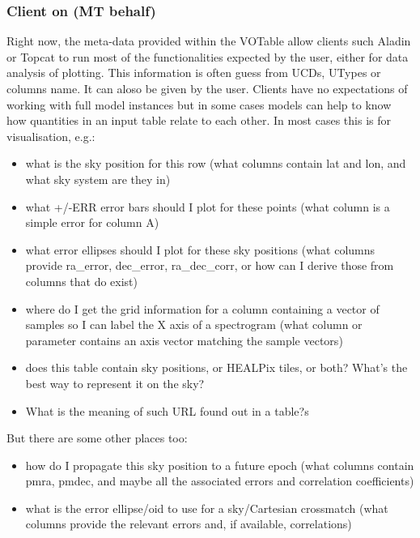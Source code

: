 \documentclass[11pt,a4paper]{ivoa}
\begin{document}
\subsubsection{Client on (MT behalf)}

Right now, the meta-data provided within the VOTable allow clients such Aladin or Topcat to run most of the functionalities expected by the user, either for data analysis of plotting.
This information is often guess from UCDs, UTypes or columns name. It can aloso be given by the user.
Clients have no expectations of working with full model instances but in some cases models can help to know how quantities in an input table relate to each other.
In most cases this is for visualisation, e.g.:
\begin{itemize}
    \item what is the sky position for this row
    (what columns contain lat and lon, and what sky system are they in)

     \item what +/-ERR error bars should I plot for these points
    (what column is a simple error for column A)

    \item what error ellipses should I plot for these sky positions
    (what columns provide ra\_error, dec\_error, ra\_dec\_corr,
     or how can I derive those from columns that do exist)

    \item where do I get the grid information for a column containing
    a vector of samples so I can label the X axis of a spectrogram
    (what column or parameter contains an axis vector matching
     the sample vectors)

    \item does this table contain sky positions, or HEALPix tiles, or both?
    What's the best way to represent it on the sky?
    
    \item What is the meaning of such URL found out in a table?s
\end{itemize}

But there are some other places too:
\begin{itemize}
    \item how do I propagate this sky position to a future epoch
    (what columns contain pmra, pmdec, and maybe all the
     associated errors and correlation coefficients)

    \item what is the error ellipse/oid to use for a sky/Cartesian crossmatch
    (what columns provide the relevant errors and, if available,
     correlations)
\end{itemize}
\end{document}
